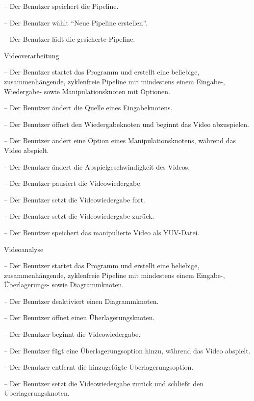 \begin{description}
\begin{trivlist}
			\item[--] Der Benutzer speichert die Pipeline.
			\item[--] Der Benutzer wählt ``Neue Pipeline erstellen''.
			\item[--] Der Benutzer lädt die gesicherte Pipeline.
		\end{trivlist}
\newpage
	\item[/T40/] Videoverarbeitung
		\begin{trivlist}
			\item[--] Der Benutzer startet das Programm und erstellt eine beliebige, zusammenhängende, zyklenfreie Pipeline mit mindestens einem Eingabe-, Wiedergabe- sowie 
				Manipulationsknoten mit Optionen.
			\item[--] Der Benutzer ändert die Quelle eines Eingabeknotens.
			\item[--] Der Benutzer öffnet den Wiedergabeknoten und beginnt das Video abzuspielen.
			\item[--] Der Benutzer ändert eine Option eines Manipulationsknotens, während das Video abspielt.
			\item[--] Der Benutzer ändert die Abspielgeschwindigkeit des Videos.
			\item[--] Der Benutzer pausiert die Videowiedergabe.
			\item[--] Der Benutzer setzt die Videowiedergabe fort.
			\item[--] Der Benutzer setzt die Videowiedergabe zurück.
			\item[--] Der Benutzer speichert das manipulierte Video als YUV-Datei.
		\end{trivlist}
	\item[/T50/] Videoanalyse
		\begin{trivlist}
			\item[--] Der Benutzer startet das Programm und erstellt eine beliebige, zusammenhängende, zyklenfreie Pipeline mit mindestens einem Eingabe-, Überlagerungs- sowie 
				Diagrammknoten.
			\item[--] Der Benutzer deaktiviert einen Diagrammknoten.
			\item[--] Der Benutzer öffnet einen Überlagerungsknoten.
			\item[--] Der Benutzer beginnt die Videowiedergabe.
			\item[--] Der Benutzer fügt eine Überlagerungsoption hinzu, während das Video abspielt.
			\item[--] Der Benutzer entfernt die hinzugefügte Überlagerungsoption.
			\item[--] Der Benutzer setzt die Videowiedergabe zurück und schließt den Überlagerungsknoten.

\end{trivlist}
\end{description}
